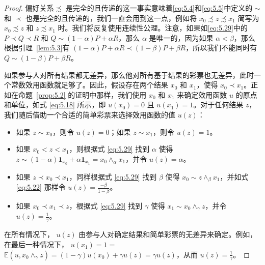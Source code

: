 \begin{proof}
偏好关系\(\precsim\) 是完全的且传递的这一事实意味着\eqref{eq:5.4}和\eqref{eq:5.5}中定义的 \(\sim\) 和 \(\prec\) 也是完全的且传递的，我们一直会用到这一点，例如将 \({x}_{0} \precsim  z \precsim  {x}_{1}\) 简写为 \({x}_{0} \precsim  z\) 和 \(z \precsim  {x}_{1}\) 时。我们将反复使用连续性公理。注意，如果如\eqref{eq:5.29}中的 \(P \prec  Q \prec  R\) 和 \(Q \sim  \left( {1 - \alpha }\right) P + {\alpha R}\)，那么 \(\alpha\) 是唯一的，因为如果 \(\alpha  < \beta\)，那么根据引理~\ref{lem:5.3}有 \(\left( {1 - \alpha }\right) P + {\alpha R} \prec  \left( {1 - \beta }\right) P + {\beta R}\)，所以我们不能同时有 \(Q \sim  \left( {1 - \beta }\right) P + {\beta R}\)。

如果参与人对所有结果都无差异，那么他对所有基于结果的彩票也无差异，此时一个常数效用函数就足够了。因此，假设存在两个结果 \({x}_{0}\) 和 \({x}_{1}\)，使得 \({x}_{0} \prec  {x}_{1}\)。正如在命题~\ref{prop:5.2} 的证明中那样，我们使用 \({x}_{0}\) 和 \({x}_{1}\) 来确定效用函数 \(u\) 的原点和单位，如式 \eqref{eq:5.18} 所示，即 \(u\left( {x}_{0}\right)  = 0\) 且 \(u\left( {x}_{1}\right)  = 1\)。对于任何结果 \(z\)，我们随后借助一个合适的简单彩票来选择效用函数的值 \(u\left( z\right)\)：
\begin{itemize}
\item 如果 \(z \sim  {x}_{0}\)，则令 \(u\left( z\right)  = 0\)；如果 \(z \sim  {x}_{1}\)，则令 \(u\left( z\right)  = 1\)。

\item 如果 \({x}_{0} < z < {x}_{1}\)，则根据式 \eqref{eq:5.29} 找到 \(\alpha\) 使得 \(z \sim  \left( {1 - \alpha }\right) {\mathbf{1}}_{{x}_{0}} + \alpha {\mathbf{1}}_{{x}_{1}} = {x}_{0}{ \land  }_{\alpha }{x}_{1}\)，并令 \(u\left( z\right)  = \alpha\)。

\item 如果 \(z \prec  {x}_{0} \prec  {x}_{1}\)，同样根据式 \eqref{eq:5.29} 找到 \(\beta\) 使得 \({x}_{0} \sim  z{ \land  }_{\beta }{x}_{1}\)，并如式 \eqref{eq:5.22} 那样令 \(u\left( z\right)  = \frac{-\beta }{1 - \beta }\)。

\item 如果 \({x}_{0} \prec  {x}_{1} \prec  z\)，根据式 \eqref{eq:5.29} 找到 \(\gamma\) 使得 \({x}_{1} \sim  {x}_{0}{ \land  }_{\gamma }z\)，并令 \(u\left( z\right)  = \frac{1}{\gamma }\)。
\end{itemize}
在所有情况下， \(u\left( z\right)\) 由参与人对确定结果和简单彩票的无差异来确定。例如，在最后一种情况下， \(u\left( {x}_{1}\right)  = 1 =\)  \(\mathbb{E}\left( {u,{x}_{0}{ \land  }_{\gamma }z}\right)  = \left( {1 - \gamma }\right) u\left( {x}_{0}\right)  + {\gamma u}\left( z\right)  = {\gamma u}\left( z\right)\)，从而 \(u\left( z\right)  = \frac{1}{\gamma }\)。


\end{proof}
